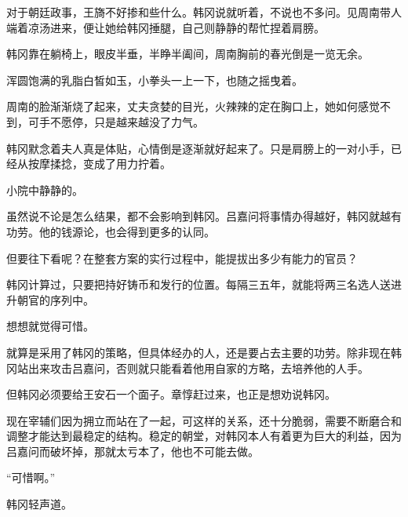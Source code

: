 对于朝廷政事，王旖不好掺和些什么。韩冈说就听着，不说也不多问。见周南带人端着凉汤进来，便让她给韩冈捶腿，自己则静静的帮忙捏着肩膀。

韩冈靠在躺椅上，眼皮半垂，半睁半阖间，周南胸前的春光倒是一览无余。

浑圆饱满的乳脂白皙如玉，小拳头一上一下，也随之摇曳着。

周南的脸渐渐烧了起来，丈夫贪婪的目光，火辣辣的定在胸口上，她如何感觉不到，可手不愿停，只是越来越没了力气。

韩冈默念着夫人真是体贴，心情倒是逐渐就好起来了。只是肩膀上的一对小手，已经从按摩揉捻，变成了用力拧着。

小院中静静的。

虽然说不论是怎么结果，都不会影响到韩冈。吕嘉问将事情办得越好，韩冈就越有功劳。他的钱源论，也会得到更多的认同。

但要往下看呢？在整套方案的实行过程中，能提拔出多少有能力的官员？

韩冈计算过，只要把持好铸币和发行的位置。每隔三五年，就能将两三名选人送进升朝官的序列中。

想想就觉得可惜。

就算是采用了韩冈的策略，但具体经办的人，还是要占去主要的功劳。除非现在韩冈站出来攻击吕嘉问，否则就只能看着他用自家的方略，去培养他的人手。

但韩冈必须要给王安石一个面子。章惇赶过来，也正是想劝说韩冈。

现在宰辅们因为拥立而站在了一起，可这样的关系，还十分脆弱，需要不断磨合和调整才能达到最稳定的结构。稳定的朝堂，对韩冈本人有着更为巨大的利益，因为吕嘉问而破坏掉，那就太亏本了，他也不可能去做。

“可惜啊。”

韩冈轻声道。

